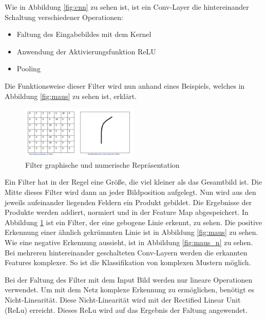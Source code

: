 Wie in Abbildung \ref{fig:cnn} zu sehen ist, ist ein Conv-Layer die hintereinander Schaltung verschiedener Operationen:
\begin{itemize}
 \item Faltung des Eingabebildes mit dem Kernel
 \item Anwendung der Aktivierungsfunktion ReLU
 \item Pooling
\end{itemize}
Die Funktionsweise dieser Filter wird nun anhand eines Beispiels, welches in Abbildung \ref{fig:maus} zu sehen ist, erklärt.

\begin{figure}[h]
  \centering
  \includegraphics[width=0.5\textwidth]{images/filter.pdf}
  \caption{Filter graphische und numerische Repräsentation \cite{github}}
  \label{fig:filter}
\end{figure}

Ein Filter hat in der Regel eine Größe, die viel kleiner als das Gesamtbild ist. Die Mitte dieses Filter wird dann an jeder Bildposition aufgelegt. Nun wird aus den jeweils aufeinander liegenden Feldern ein Produkt gebildet. Die Ergebnisse der Produkte werden addiert, normiert und in der Feature Map abgespeichert. In Abbildung \ref{fig:filter} ist ein Filter, der eine gebogene Linie erkennt, zu sehen. 
Die positive Erkennung einer ähnlich gekrümmten Linie ist in Abbildung \ref{fig:maus} zu sehen. Wie eine negative Erkennung aussieht, ist in Abbildung \ref{fig:maus_n} zu sehen. 
Bei mehreren hintereinander geschalteten Conv-Layern werden die erkannten Features komplexer. So ist die Klassifikation von komplexen Mustern möglich.

Bei der Faltung des Filter mit dem Input Bild werden nur lineare Operationen verwendet. Um mit dem Netz komplexe Erkennung zu ermöglichen, benötigt es Nicht-Linearität. Diese Nicht-Linearität wird mit der Rectified Linear Unit (ReLu) erreicht. Dieses ReLu wird auf das Ergebnis der Faltung angewendet. 

